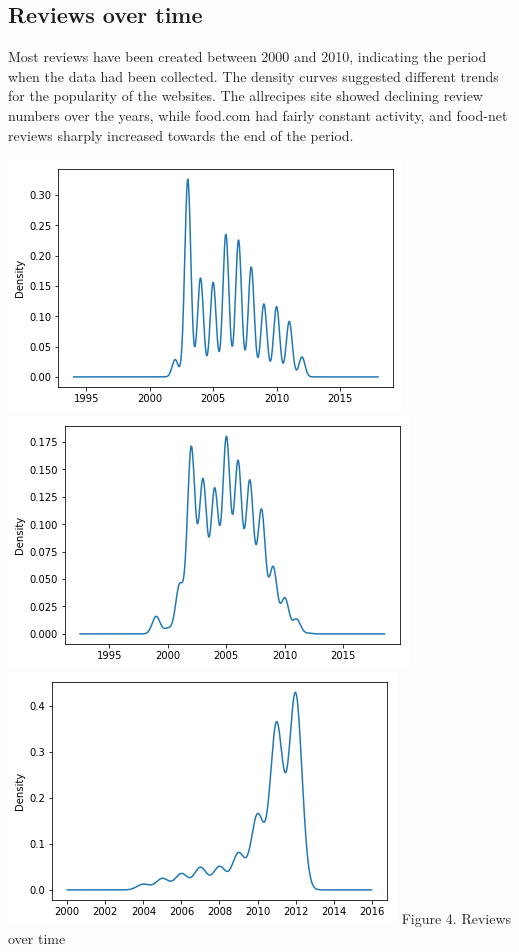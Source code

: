 \documentclass[11pt]{article}
\begin{document}
\subsection{Reviews over time}

Most reviews have been created between 2000 and 2010, indicating the period when the data had been collected. The density curves suggested different trends for the popularity of the websites. The allrecipes site showed declining review numbers over the years, while food.com had fairly constant activity, and food-net reviews sharply increased towards the end of the period.

\vspace{5mm}
\begin{center}
\includegraphics[scale=0.17]{time-1}
\includegraphics[scale=0.17]{time-2}
\includegraphics[scale=0.17]{time-3}
\label{visalization-time} Figure 4. Reviews over time
\end{center}
\vspace{5mm}
\end{document}

